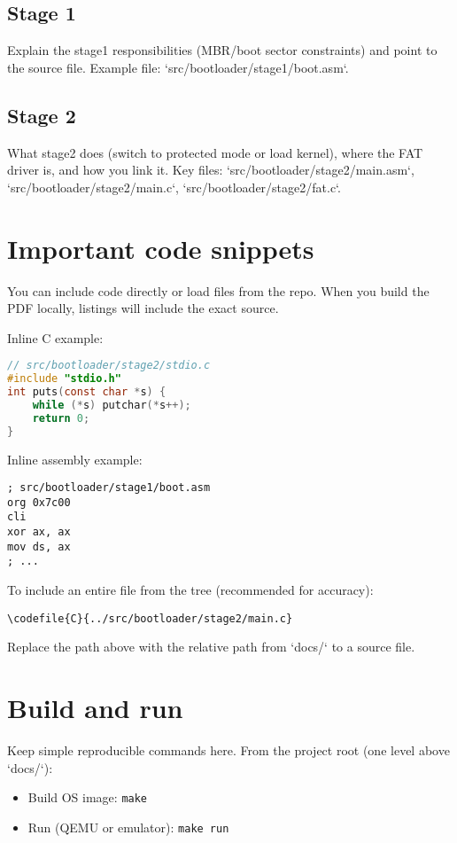 \documentclass[11pt,a4paper]{article}
\newcommand{\codefile}[2]{}
\begin{document}
\subsection{Stage 1}
Explain the stage1 responsibilities (MBR/boot sector constraints) and point to the source file.
Example file: `src/bootloader/stage1/boot.asm`.

\subsection{Stage 2}
What stage2 does (switch to protected mode or load kernel), where the FAT driver is, and how you link it.
Key files: `src/bootloader/stage2/main.asm`, `src/bootloader/stage2/main.c`, `src/bootloader/stage2/fat.c`.

\section{Important code snippets}
You can include code directly or load files from the repo. When you build the PDF locally, listings will include the exact source.

Inline C example:
\begin{lstlisting}[language=C,caption={Minimal example from stdio.c}]
// src/bootloader/stage2/stdio.c
#include "stdio.h"
int puts(const char *s) {
	while (*s) putchar(*s++);
	return 0;
}
\end{lstlisting}

Inline assembly example:
\begin{lstlisting}[language=asm86,caption={Boot sector entry (example)}]
; src/bootloader/stage1/boot.asm
org 0x7c00
cli
xor ax, ax
mov ds, ax
; ...
\end{lstlisting}

To include an entire file from the tree (recommended for accuracy):
\begin{verbatim}
\codefile{C}{../src/bootloader/stage2/main.c}
\end{verbatim}

Replace the path above with the relative path from `docs/` to a source file.

\section{Build and run}
Keep simple reproducible commands here. From the project root (one level above `docs/`):
\begin{itemize}
	\item Build OS image: \texttt{make}
	\item Run (QEMU or emulator): \texttt{make run}
\end{itemize}
\end{document}
